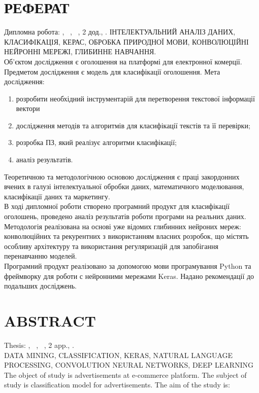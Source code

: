 \chapter*{РЕФЕРАТ}							%

Дипломна робота: , 
~,
~,
2 дод.,
.
ІНТЕЛЕКТУАЛЬНИЙ АНАЛІЗ ДАНИХ, КЛАСИФІКАЦІЯ, КЕРАС,
ОБРОБКА ПРИРОДНОЇ МОВИ, КОНВОЛЮЦІЙНІ НЕЙРОННІ МЕРЕЖІ, ГЛИБИННЕ НАВЧАННЯ.\\
Об’єктом дослідження є оголошення на платформі для електронної комерції. Предметом дослідження є модель для класифікації оголошення.
Мета дослідження:
\begin{enumerate}
	\item розробити необхідний інструментарій для перетворення текстової інформації вектори
	\item дослідження методів та алгоритмів для класифікації текстів та її перевірки;
	\item розробка ПЗ, який реалізує алгоритми класифікації;
    \item аналіз результатів.
\end{enumerate}

Теоретичною та методологічною основою дослідження є праці
закордонних вчених в галузі інтелектуальної обробки даних, математичного
моделювання, класифікації даних та маркетингу. \\
В ході дипломної роботи створено програмний продукт для класифікації оголошень, проведено аналіз результатів роботи програми на реальних даних. \\
Методологія реалізована на основі уже відомих глибинних нейроних мереж: конволюційних та рекурентних з використанням власних розробок, що містять особливу архітектуру та використання регуляризацій для запобігання перенавчанню моделей.\\
Програмний продукт реалізовано за допомогою мови програмування
Python та фреймворку для роботи с нейронними мережами Keras. Надано
рекомендації до подальших досліджень. \\


\chapter*{ABSTRACT}						


Thesis: , 
~,
~,
2 app.,
. \\
DATA MINING, CLASSIFICATION, KERAS, NATURAL LANGUAGE PROCESSING, CONVOLUTION NEURAL NETWORKS, DEEP LEARNING \\
The object of study is advertisements at e-commerce
platform. The subject of study is classification model for
advertisements.
The aim of the study is:


